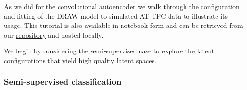 As we did for the convolutional autoencoder we walk through the configuration and fitting of the DRAW model to simulated AT-TPC data to illustrate its usage. This tutorial is also available in notebook form and can be retrieved  from our \href{https://github.com/ATTPC/VAE-event-classification/blob/master/notebooks/simulated_draw_tutorial.ipynb}{repository} and hosted locally.

We begin by considering the semi-supervised case to explore the latent configurations that yield high quality latent spaces. 

\subsubsection{Semi-supervised classification }